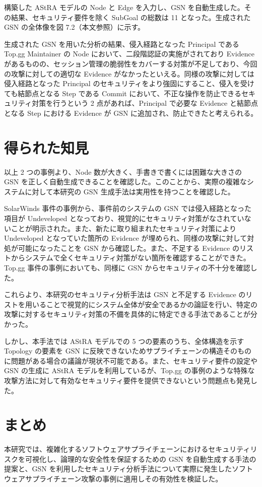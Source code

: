 \documentclass[paper]{ieicej} %
\begin{document}
構築した AStRA モデルの Node と Edge を入力し、GSN を自動生成した。その結果、セキュリティ要件を除く SubGoal の総数は 11 となった。生成された GSN の全体像を図 7.2（本文参照）に示す。

生成された GSN を用いた分析の結果、侵入経路となった Principal である Top.gg Maintainer の Node において、二段階認証の実施がされており Evidence があるものの、セッション管理の脆弱性をカバーする対策が不足しており、今回の攻撃に対しての適切な Evidence がなかったといえる。同様の攻撃に対しては侵入経路となった Principal のセキュリティをより強固にすること、侵入を受けても結節点となる Step である Commit において、不正な操作を防止できるセキュリティ対策を行うという 2 点があれば、Principal で必要な Evidence と結節点となる Step における Evidence が GSN に追加され、防止できたと考えられる。

\section{得られた知見}
以上 2 つの事例より、Node 数が大きく、手書きで書くには困難な大きさの GSN を正しく自動生成できることを確認した。このことから、実際の複雑なシステムに対して本研究の GSN 生成手法は実用性を持つことを確認した。

SolarWinds 事件の事例から、事件前のシステムの GSN では侵入経路となった項目が Undeveloped となっており、視覚的にセキュリティ対策がなされていないことが明示された。また、新たに取り組まれたセキュリティ対策により Undeveloped となっていた箇所の Evidence が埋められ、同様の攻撃に対して対処が可能になったことを GSN から確認した。また、不足する Evidence のリストからシステムで全くセキュリティ対策がない箇所を確認することができた。Top.gg 事件の事例においても、同様に GSN からセキュリティの不十分を確認した。

これらより、本研究のセキュリティ分析手法は GSN と不足する Evidence のリストを用いることで視覚的にシステム全体が安全であるかの論証を行い、特定の攻撃に対するセキュリティ対策の不備を具体的に特定できる手法であることが分かった。

しかし、本手法では AStRA モデルでの 5 つの要素のうち、全体構造を示す Topology の要素を GSN に反映できないためサプライチェーンの構造そのものに問題がある場合の議論が現状不可能である。また、セキュリティ要件の設定や GSN の生成に AStRA モデルを利用しているが、Top.gg の事例のような特殊な攻撃方法に対して有効なセキュリティ要件を提供できないという問題点も発見した。

\section{まとめ}
本研究では、複雑化するソフトウェアサプライチェーンにおけるセキュリティリスクを可視化し、論理的な安全性を保証するための GSN を自動生成する手法の提案と、GSN を利用したセキュリティ分析手法について実際に発生したソフトウェアサプライチェーン攻撃の事例に適用しその有効性を検証した。
\end{document}
